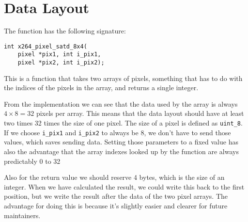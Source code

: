 \section{Data Layout}

The \satd{} function has the following signature:

\begin{verbatim}
int x264_pixel_satd_8x4(
    pixel *pix1, int i_pix1,
    pixel *pix2, int i_pix2);
\end{verbatim}

This is a function that takes two arrays of pixels, something that has to do
with the indices of the pixels in the array, and returns a single integer.

From the implementation we can see that the data used by the array is always $4
\times 8 = 32$ pixels per array. This means that the data layout should have at
least two times 32 times the size of one pixel. The size of a pixel is defined
as \texttt{uint\_8}. If we choose \texttt{i\_pix1} and \texttt{i\_pix2} to
always be 8, we don't have to send those values, which saves sending data.
Setting those parameters to a fixed value has also the advantage that the array
indexes looked up by the function are always predictably 0 to 32

Also for the return value we should reserve 4 bytes, which is the size of an
integer. When we have calculated the result, we could write this back to the
first position, but we write the result after the data of the two pixel arrays.
The advantage for doing this is because it's slightly easier and clearer for future maintainers. 
